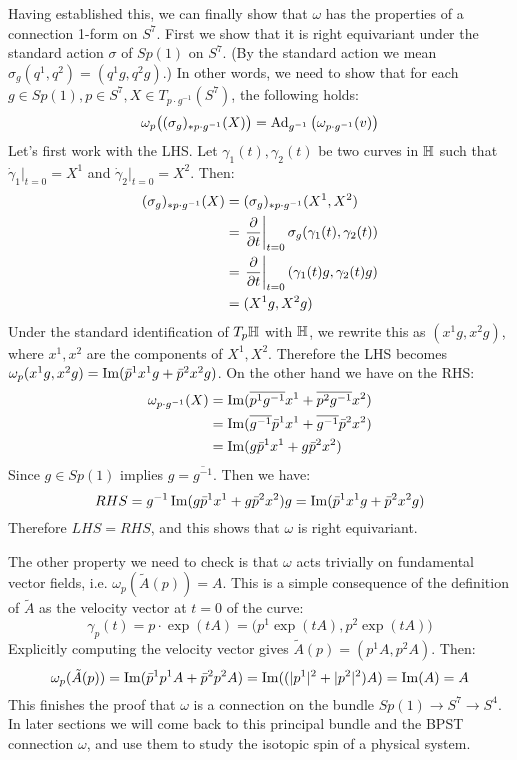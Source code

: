 Having established this, we can finally show that $\omega$ has the properties of a connection 1-form on $S^7$. First we show that it is right equivariant under the standard action $\sigma$ of $Sp(1)$ on $S^7$. (By the standard action we mean $\sigma_g(q^1, q^2) = (q^1 g, q^2 g)$.) In other words, we need to show that for each $g \in Sp(1), p \in S^7, X \in T_{p \cdot g^{-1}}(S^7)$, the following holds:
\[     \omega_p\big((\sigma_g)_{*p\cdot g^{-1}}(X)\big) = \operatorname{Ad}_{g^{-1}}\big(\omega_{p\cdot g^{-1}} (v)\big)   \]
Let's first work with the LHS. Let $\gamma_1(t), \gamma_2(t)$ be two curves in $\mathbb{H}$ such that $\dot \gamma_1|_{t=0} = X^1$ and $\dot \gamma_2|_{t=0} = X^2$. Then:
\begin{align*}      
(\sigma_g)_{*p\cdot g^{-1}}(X) &= (\sigma_g)_{*p\cdot g^{-1}}(X^1, X^2) \\
&= \left. \frac{\partial}{\partial t} \right|_{t=0} \sigma_g (\gamma_1(t), \gamma_2(t)) \\
&= \left. \frac{\partial}{\partial t} \right|_{t=0} (\gamma_1(t) g, \gamma_2(t) g) \\
&= (X^1 g, X^2 g)
\end{align*}
Under the standard identification of $T_p \mathbb{H}$ with $\mathbb{H}$, we rewrite this as $(x^1 g, x^2g)$, where $x^1, x^2$ are the components of $X^1, X^2$. Therefore the LHS becomes $\omega_p(x^1 g, x^2g) = \operatorname{Im}(\bar p^1 x^1 g + \bar p^2 x^2 g)$. On the other hand we have on the RHS:
\begin{align*}
\omega_{p\cdot g^{-1}} (X) &= \operatorname{Im}(\overline{p^1 g^{-1}}x^1 + \overline{p^2 g^{-1}} x^2) \\
&= \operatorname{Im}(\overline{g^{-1}} \bar p^1 x^1 + \overline{g^{-1}} \bar p^2 x^2) \\
&= \operatorname{Im}(g \bar p^1 x^1 + g \bar p^2 x^2)
\end{align*}
Since $g\in Sp(1)$ implies $g = \overline{g^{-1}}$. Then we have:
\[     RHS = g^{-1} \operatorname{Im}(g \bar p^1 x^1 + g \bar p^2 x^2) g  = \operatorname{Im}( \bar p^1 x^1 g +  \bar p^2 x^2 g)     \]
Therefore $LHS = RHS$, and this shows that $\omega$ is right equivariant.

The other property we need to check is that $\omega$ acts trivially on fundamental vector fields, i.e. $\omega_p (\tilde A (p)) = A$. This is a simple consequence of the definition of $\tilde A$ as the velocity vector at $t=0$ of the curve:
\[ \gamma_p(t) = p \cdot \exp(tA) =  \big(p^1 \exp(tA) , p^2 \exp(tA)\big) \]
Explicitly computing the velocity vector gives $\tilde A(p) = (p^1 A, p^2 A)$. Then:
\[    \omega_p(\tilde A(p)) = \operatorname{Im}( \bar p^1 p^1 A + \bar p^2 p^2 A ) = \operatorname{Im}((|p^1|^2 + |p^2|^2 )A) = \operatorname{Im}(A) = A   \]
This finishes the proof that $\omega$ is a connection on the bundle $Sp(1) \to S^7 \to S^4$. In later sections we will come back to this principal bundle and the BPST connection $\omega$, and use them to study the isotopic spin of a physical system.

